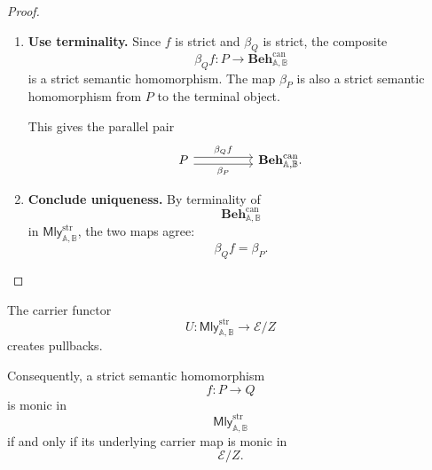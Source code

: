 \begin{proof}
    \leavevmode
    \begin{enumerate}
        \item \textbf{Use terminality.}
        Since \(f\) is strict and \(\beta_Q\) is strict, the composite
        \[
            \beta_Qf:P\to\mathbf{Beh}^{\mathrm{can}}_{\mathbb A,\mathbb B}
        \]
        is a strict semantic homomorphism. The map \(\beta_P\) is also a strict
        semantic homomorphism from \(P\) to the terminal object.

        This gives the parallel pair
        \[
        \begin{tikzcd}[column sep=huge, row sep=large]
            P
                \arrow[r, shift left=0.65ex, "\beta_Qf"]
                \arrow[r, shift right=0.65ex, "\beta_P"']
            &
            \mathbf{Beh}^{\mathrm{can}}_{\mathbb A,\mathbb B}.
        \end{tikzcd}
        \]

        \item \textbf{Conclude uniqueness.}
        By terminality of
        \[
            \mathbf{Beh}^{\mathrm{can}}_{\mathbb A,\mathbb B}
        \]
        in \(\mathsf{Mly}^{\mathrm{str}}_{\mathbb A,\mathbb B}\), the two maps
        agree:
        \[
            \beta_Qf=\beta_P.
        \]
    \end{enumerate}
\end{proof}

\begin{lemma}
\label{lem:coeq-carrier-created-pullbacks-monomorphisms}
    The carrier functor
    \[
        U:
        \mathsf{Mly}^{\mathrm{str}}_{\mathbb A,\mathbb B}
        \longrightarrow
        \mathcal E/Z
    \]
    creates pullbacks.

    Consequently, a strict semantic homomorphism
    \[
        f:P\to Q
    \]
    is monic in
    \[
        \mathsf{Mly}^{\mathrm{str}}_{\mathbb A,\mathbb B}
    \]
    if and only if its underlying carrier map is monic in
    \[
        \mathcal E/Z.
    \]
\end{lemma}

